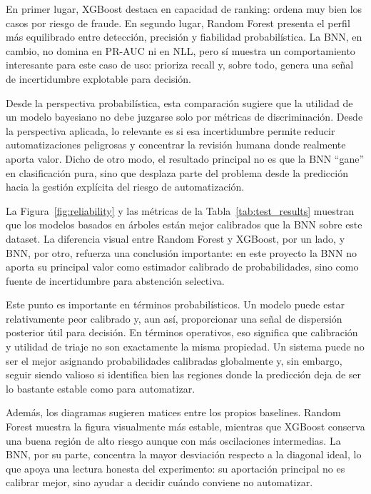 \documentclass{article}
\begin{document}
En primer lugar, XGBoost destaca en capacidad de ranking: ordena muy bien los casos por riesgo de fraude. En segundo lugar, Random Forest presenta el perfil más equilibrado entre detección, precisión y fiabilidad probabilística. La BNN, en cambio, no domina en PR-AUC ni en NLL, pero sí muestra un comportamiento interesante para este caso de uso: prioriza recall y, sobre todo, genera una señal de incertidumbre explotable para decisión.

Desde la perspectiva probabilística, esta comparación sugiere que la utilidad de un modelo bayesiano no debe juzgarse solo por métricas de discriminación. Desde la perspectiva aplicada, lo relevante es si esa incertidumbre permite reducir automatizaciones peligrosas y concentrar la revisión humana donde realmente aporta valor. Dicho de otro modo, el resultado principal no es que la BNN ``gane'' en clasificación pura, sino que desplaza parte del problema desde la predicción hacia la gestión explícita del riesgo de automatización.

La Figura~\ref{fig:reliability} y las métricas de la Tabla~\ref{tab:test_results} muestran que los modelos basados en árboles están mejor calibrados que la BNN sobre este dataset. La diferencia visual entre Random Forest y XGBoost, por un lado, y BNN, por otro, refuerza una conclusión importante: en este proyecto la BNN no aporta su principal valor como estimador calibrado de probabilidades, sino como fuente de incertidumbre para abstención selectiva.

Este punto es importante en términos probabilísticos. Un modelo puede estar relativamente peor calibrado y, aun así, proporcionar una señal de dispersión posterior útil para decisión. En términos operativos, eso significa que calibración y utilidad de triaje no son exactamente la misma propiedad. Un sistema puede no ser el mejor asignando probabilidades calibradas globalmente y, sin embargo, seguir siendo valioso si identifica bien las regiones donde la predicción deja de ser lo bastante estable como para automatizar.

Además, los diagramas sugieren matices entre los propios baselines. Random Forest muestra la figura visualmente más estable, mientras que XGBoost conserva una buena región de alto riesgo aunque con más oscilaciones intermedias. La BNN, por su parte, concentra la mayor desviación respecto a la diagonal ideal, lo que apoya una lectura honesta del experimento: su aportación principal no es calibrar mejor, sino ayudar a decidir cuándo conviene no automatizar.
\end{document}
